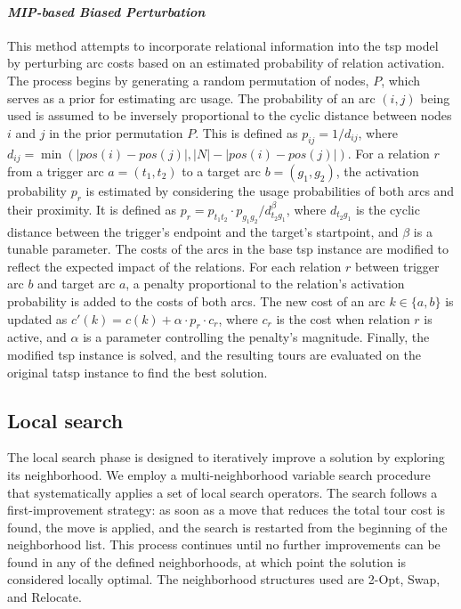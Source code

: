 \documentclass[twocolumn, switch]{article} %
\begin{document}
\paragraph{\textit{MIP-based Biased Perturbation}}
This method attempts to incorporate relational information into the \gls{tsp} model by perturbing arc costs based on an estimated probability of relation activation. The process begins by generating a random permutation of nodes, $P$, which serves as a prior for estimating arc usage. The probability of an arc $(i, j)$ being used is assumed to be inversely proportional to the cyclic distance between nodes $i$ and $j$ in the prior permutation $P$. This is defined as $p_{ij} = 1/d_{ij}$, where $d_{ij} = \min(|pos(i)-pos(j)|, |N| - |pos(i)-pos(j)|)$. For a relation $r$ from a trigger arc $a=(t_1, t_2)$ to a target arc $b=(g_1, g_2)$, the activation probability $p_r$ is estimated by considering the usage probabilities of both arcs and their proximity. It is defined as $p_r = p_{t_1t_2} \cdot p_{g_1g_2} / d_{t_2g_1}^\beta$, where $d_{t_2g_1}$ is the cyclic distance between the trigger's endpoint and the target's startpoint, and $\beta$ is a tunable parameter. The costs of the arcs in the base \gls{tsp} instance are modified to reflect the expected impact of the relations. For each relation $r$ between trigger arc $b$ and target arc $a$, a penalty proportional to the relation's activation probability is added to the costs of both arcs. The new cost of an arc $k \in \{a,b\}$ is updated as $c'(k) = c(k) + \alpha \cdot p_r \cdot c_r$, where $c_r$ is the cost when relation $r$ is active, and $\alpha$ is a parameter controlling the penalty's magnitude. Finally, the modified \gls{tsp} instance is solved, and the resulting tours are evaluated on the original \gls{tatsp} instance to find the best solution.

\subsection{Local search}
The local search phase is designed to iteratively improve a solution by exploring its neighborhood. We employ a multi-neighborhood variable search procedure that systematically applies a set of local search operators. The search follows a first-improvement strategy: as soon as a move that reduces the total tour cost is found, the move is applied, and the search is restarted from the beginning of the neighborhood list. This process continues until no further improvements can be found in any of the defined neighborhoods, at which point the solution is considered locally optimal. The neighborhood structures used are 2-Opt, Swap, and Relocate.
\end{document}
